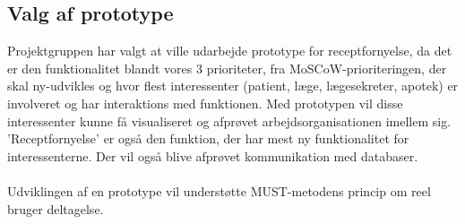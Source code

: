 \subsection{Valg af prototype}
Projektgruppen har valgt at ville udarbejde prototype for receptfornyelse, da det er den funktionalitet blandt vores 3 prioriteter, fra MoSCoW-prioriteringen, der skal ny-udvikles og hvor flest interessenter (patient, læge, lægesekreter, apotek) er involveret og har interaktions med funktionen. Med prototypen vil disse interessenter kunne få visualiseret og afprøvet arbejdsorganisationen imellem sig. ’Receptfornyelse’ er også den funktion, der har mest ny funktionalitet for interessenterne. 
Der vil også blive afprøvet kommunikation med databaser. \\ 
\\
Udviklingen af en prototype vil understøtte MUST-metodens princip om reel bruger deltagelse.
